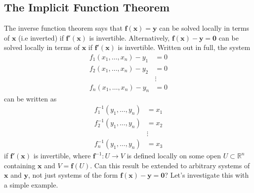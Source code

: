 \documentclass{article}
\newcommand{\R}{\mathbb{R}}
\newcommand{\x}{\mathbf{x}}
\newcommand{\f}{\mathbf{f}}
\newcommand{\y}{\mathbf{y}}
\newcommand{\ze}{\mathbf{0}}
\theoremstyle{definition}
\begin{document}
	\subsection{The Implicit Function Theorem}
	The inverse function theorem says that $ \f(\x) = \y $ can be solved locally in terms of $ \x $ (i.e inverted) if $ \f'(\x) $ is invertible. Alternatively,  $ \f(\x) - \y = \ze $ can be solved locally in terms of $ \x $ if $ \f'(\x) $ is invertible. Written out in full, the system 
	\begin{align*}
		f_1(x_1, \ldots, x_n)  - y_1 & = 0\\ 
		f_2(x_1, \ldots, x_n)  - y_2 & = 0\\
		&\vdots\\
		f_n(x_1, \ldots, x_n)  - y_n & = 0
	\end{align*}
	can be written as 
	\begin{align*}
		f_1^{-1}(y_1, \ldots, y_n)   & = x_1\\ 
		f_2^{-1}(y_1, \ldots, y_n)   & = x_2\\
		&\vdots\\
		f_n^{-1}(y_1, \ldots, y_n)   & = x_3
	\end{align*}
	if $ \f'(\x) $ is invertible, where $ \f^{-1}:U\to V $ is defined locally on some open $ U\subset \R^n $ containing $ \x $ and $ V= \f(U) $. Can this result be extended to arbitrary systems of $ \x $ and $ \y $, not just systems of the form $ \f(\x)-\y = \ze $? Let's investigate this with a simple example.
\end{document}

